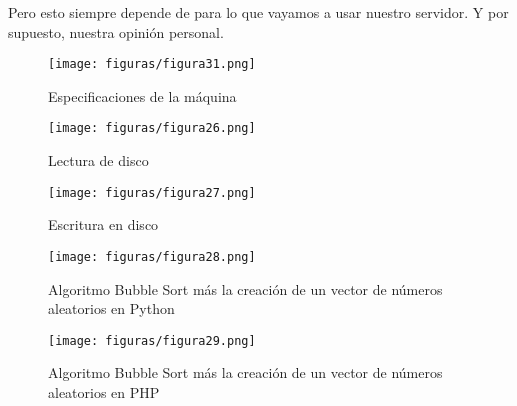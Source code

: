 Pero esto siempre depende de para lo que vayamos a usar nuestro servidor. Y por supuesto, nuestra opinión personal.

\begin{figure}[H] %
	\centering
	\texttt{[image: figuras/figura31.png]}  %
	
	
	\caption{Especificaciones de la máquina}
	\label{figura31}
\end{figure}

\begin{figure}[H] %
	\centering
	\texttt{[image: figuras/figura26.png]}  %
	
	
	\caption{Lectura de disco}
	\label{figura26}
\end{figure}

\begin{figure}[H] %
	\centering
	\texttt{[image: figuras/figura27.png]}  %
	
	
	\caption{Escritura en disco}
	\label{figura27}
\end{figure}

\begin{figure}[H] %
	\centering
	\texttt{[image: figuras/figura28.png]}  %
	
	
	\caption{Algoritmo Bubble Sort más la creación de un vector de números aleatorios en Python}
	\label{figura28}
\end{figure}

\begin{figure}[H] %
	\centering
	\texttt{[image: figuras/figura29.png]}  %
	
	
	\caption{Algoritmo Bubble Sort más la creación de un vector de números aleatorios en PHP}
	\label{figura29}
\end{figure}

